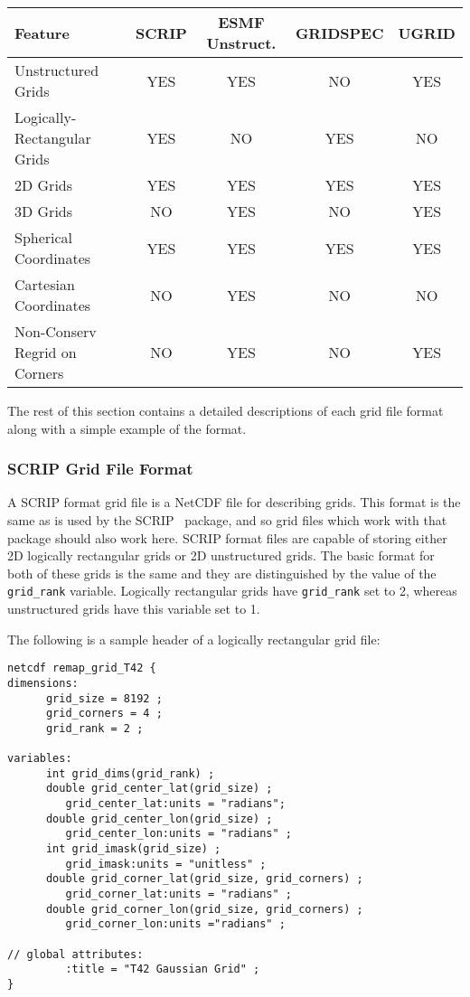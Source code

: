 \begin{center}
\begin{tabular}{|l|c|c|c|c|}
\hline
Feature & SCRIP  & ESMF Unstruct. & GRIDSPEC & UGRID\\
\hline
Unstructured Grids            & YES & YES & NO  & YES\\
Logically-Rectangular Grids   & YES & NO  & YES & NO \\
2D Grids                      & YES & YES & YES & YES\\
3D Grids                      & NO  & YES & NO  & YES\\
Spherical Coordinates         & YES & YES & YES & YES\\
Cartesian Coordinates         & NO  & YES & NO  & NO \\
Non-Conserv Regrid on Corners & NO  & YES & NO  & YES\\
\hline
\end{tabular}
\label{fig:gridfileformatfeatures}
\end{center}


 The rest of this section contains a detailed descriptions of each grid file format along with a simple example of the format. 

\subsubsection{SCRIP Grid File Format}\label{sec:fileformat:scrip}

A SCRIP format grid file is a NetCDF file for describing grids. This format is the same as is used by the SCRIP~\cite{ref:SCRIP}
package, and so grid files which work with that package should also work here.  SCRIP format files are capable of storing either 2D logically rectangular
grids or 2D unstructured grids. The basic format for both of these grids is the same and they are distinguished by the
value of the {\tt grid\_rank} variable. Logically rectangular grids have {\tt grid\_rank} set to 2,
whereas unstructured grids have this variable set to 1.

The following is a sample header of a logically rectangular grid file:

\begin{verbatim}
netcdf remap_grid_T42 {
dimensions:
      grid_size = 8192 ;
      grid_corners = 4 ;
      grid_rank = 2 ;

variables:
      int grid_dims(grid_rank) ;
      double grid_center_lat(grid_size) ;
         grid_center_lat:units = "radians";
      double grid_center_lon(grid_size) ;
         grid_center_lon:units = "radians" ;
      int grid_imask(grid_size) ;
         grid_imask:units = "unitless" ;
      double grid_corner_lat(grid_size, grid_corners) ;
         grid_corner_lat:units = "radians" ;
      double grid_corner_lon(grid_size, grid_corners) ;
         grid_corner_lon:units ="radians" ;

// global attributes:
         :title = "T42 Gaussian Grid" ;
}
\end{verbatim}

